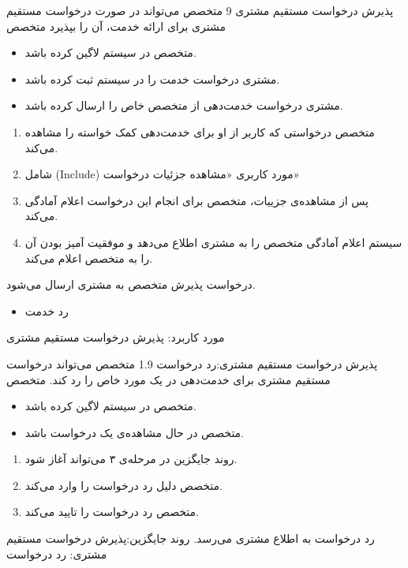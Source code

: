{
	\usecase
	{پذیرش درخواست مستقیم مشتری}
	{9}
	{متخصص می‌تواند در صورت درخواست مستقیم مشتری برای ارائه خدمت، آن را بپذیرد}
	{متخصص}
	{}
	{	
		\begin{itemize}
			\vspace*{-0.6cm}
			\item 
			متخصص در سیستم لاگین کرده باشد.
			\item
			مشتری درخواست خدمت را در سیستم ثبت کرده باشد.
			\item
			مشتری درخواست خدمت‌دهی از متخصص خاص را ارسال کرده باشد.
		\end{itemize}
	}
	{
		\vspace*{-0.6cm}
		\begin{enumerate}
			\item
			متخصص درخواستی که کاربر از او برای خدمت‌دهی کمک خواسته را مشاهده می‌کند.
			\item 
			شامل (Include) مورد کاربری «مشاهده جزئیات درخواست»
			\item
			پس از مشاهده‌ی جزییات، متخصص برای انجام این درخواست اعلام آمادگی می‌کند.
			\item
			سیستم اعلام آمادگی متخصص را به مشتری اطلاع می‌دهد و موفقیت آمیز بودن آن را به متخصص اعلام می‌کند.
		\end{enumerate}
	}
	{درخواست پذیرش متخصص به مشتری ارسال می‌شود.}
	{
		\begin{itemize}
			\vspace*{-0.6cm}
			\item
			رد خدمت
		\end{itemize}
	}
	{
		مورد کاربرد: پذیرش درخواست مستقیم مشتری
	}
	
	\alternativeflow
	{
		پذیرش درخواست مستقیم مشتری:رد درخواست
	}
	{1.9}
	{
		متخصص می‌تواند درخواست‌ مستقیم مشتری برای خدمت‌دهی در یک مورد خاص را رد کند.
	}
	{
		متخصص
	}
	{}
	{
		\begin{itemize}
			\vspace*{-0.6cm}
			\item 
			متخصص در سیستم لاگین کرده باشد.
			\item
			متخصص در حال مشاهده‌ی یک درخواست باشد.
		\end{itemize}
	}
	{
		\vspace*{-0.6cm}
		\begin{enumerate}
			\item 
			روند جایگزین در مرحله‌ی ۳ می‌تواند آغاز شود.
			\item
			متخصص دلیل رد درخواست را وارد می‌کند.
			\item
			متخصص رد درخواست را تایید می‌کند.
		
		\end{enumerate}
	}
	{
		رد درخواست به اطلاع مشتری می‌رسد.
	}
	{
		روند جایگزین:پذیرش درخواست مستقیم مشتری: رد درخواست
	}
}


